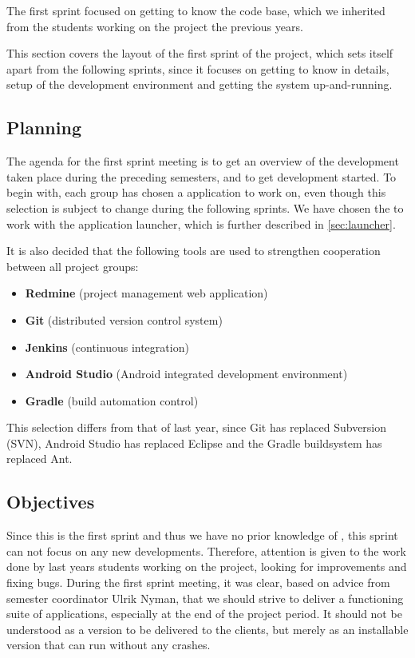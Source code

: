The first sprint focused on getting to know the \giraf code base, which we inherited from the students working on the project the previous years. 

This section covers the layout of the first sprint of the project, which sets itself apart from the following sprints, since it focuses on getting to know \giraf in details, setup of the development environment and getting the system up-and-running.

\subsection{Planning}\label{sec:sprint1:planning}
The agenda for the first sprint meeting is to get an overview of the development taken place during the preceding semesters, and to get development started.
To begin with, each group has chosen a \giraf application to work on, even though this selection is subject to change during the following sprints.
We have chosen the to work with the application launcher, which is further described in \cref{sec:launcher}.

It is also decided that the following tools are used to strengthen cooperation between all project groups:

\begin{itemize}
\item \textbf{Redmine} (project management web application)
\item \textbf{Git} (distributed version control system)
\item \textbf{Jenkins} (continuous integration)
\item \textbf{Android Studio} (Android integrated development environment)
\item \textbf{Gradle} (build automation control)
\end{itemize}

This selection differs from that of last year, since Git has replaced Subversion (SVN), Android Studio has replaced Eclipse and the Gradle buildsystem has replaced Ant.

\subsection{Objectives}\label{sec:sprint1:objectives}
Since this is the first sprint and thus we have no prior knowledge of \giraf, this sprint can not focus on any new developments.
Therefore, attention is given to the work done by last years students working on the project, looking for improvements and fixing bugs.
During the first sprint meeting, it was clear, based on advice from semester coordinator Ulrik Nyman, that we should strive to deliver a functioning suite of applications, especially at the end of the project period.
It should not be understood as a version to be delivered to the clients, but merely as an installable version that can run without any crashes. 

